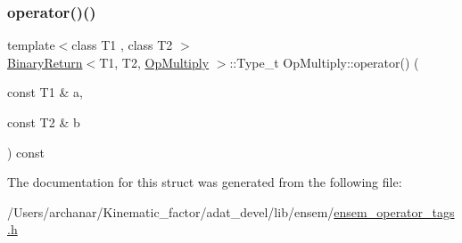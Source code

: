 \mbox{\label{structOpMultiply_a47917bc9d52d19692e9716a60938d364}} 
\subsubsection{\texorpdfstring{operator()()}{operator()()}\hspace{0.1cm}{\footnotesize\ttfamily [2/2]}}
{\footnotesize\ttfamily template$<$class T1 , class T2 $>$ \\
\mbox{\hyperlink{structBinaryReturn}{Binary\+Return}}$<$T1, T2, \mbox{\hyperlink{structOpMultiply}{Op\+Multiply}} $>$\+::Type\+\_\+t Op\+Multiply\+::operator() (\begin{DoxyParamCaption}\item[{const T1 \&}]{a,  }\item[{const T2 \&}]{b }\end{DoxyParamCaption}) const\hspace{0.3cm}{\ttfamily [inline]}}



The documentation for this struct was generated from the following file\+:\begin{DoxyCompactItemize}
\item 
/\+Users/archanar/\+Kinematic\+\_\+factor/adat\+\_\+devel/lib/ensem/\mbox{\hyperlink{lib_2ensem_2ensem__operator__tags_8h}{ensem\+\_\+operator\+\_\+tags.\+h}}\end{DoxyCompactItemize}
